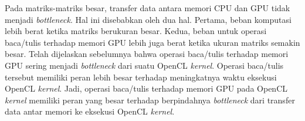 Pada matriks-matriks besar, transfer data antara memori CPU dan GPU tidak menjadi \textit{bottleneck}. Hal ini disebabkan oleh dua hal. Pertama, beban komputasi lebih berat ketika matriks berukuran besar. Kedua, beban untuk operasi baca/tulis terhadap memori GPU lebih juga berat ketika ukuran matriks semakin besar. Telah dijelaskan sebelumnya bahwa operasi baca/tulis terhadap memori GPU sering menjadi \textit{bottleneck} dari suatu OpenCL \textit{kernel}. Operasi baca/tulis tersebut memiliki peran lebih besar terhadap meningkatnya waktu eksekusi OpenCL \textit{kernel}. Jadi, operasi baca/tulis terhadap memori GPU pada OpenCL \textit{kernel} memiliki peran yang besar terhadap berpindahnya \textit{bottleneck} dari transfer data antar memori ke eksekusi OpenCL \textit{kernel}.